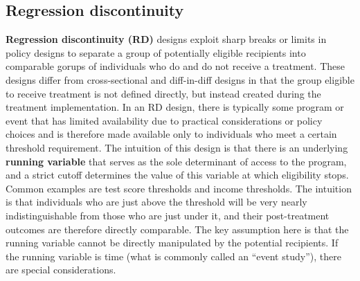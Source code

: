 \subsection{Regression discontinuity}

\textbf{Regression discontinuity (RD)} designs exploit sharp breaks or limits
in policy designs to separate a group of potentially eligible recipients
into comparable gorups of individuals who do and do not receive a treatment.
These designs differ from cross-sectional and diff-in-diff designs
in that the group eligible to receive treatment is not defined directly,
but instead created during the treatment implementation.
In an RD design, there is typically some program or event
that has limited availability due to practical considerations or policy choices
and is therefore made available only to individuals who meet a certain threshold requirement.
The intuition of this design is that there is an underlying \textbf{running variable}
that serves as the sole determinant of access to the program,
and a strict cutoff determines the value of this variable at which eligibility stops.\cite{imbens2008regression}
Common examples are test score thresholds and income thresholds.
The intuition is that individuals who are just above the threshold
will be very nearly indistinguishable from those who are just under it,
and their post-treatment outcomes are therefore directly comparable.\cite{lee2010regression}
The key assumption here is that the running variable cannot be directly manipulated
by the potential recipients.
If the running variable is time (what is commonly called an ``event study''),
there are special considerations.\cite{hausman2018regression}

